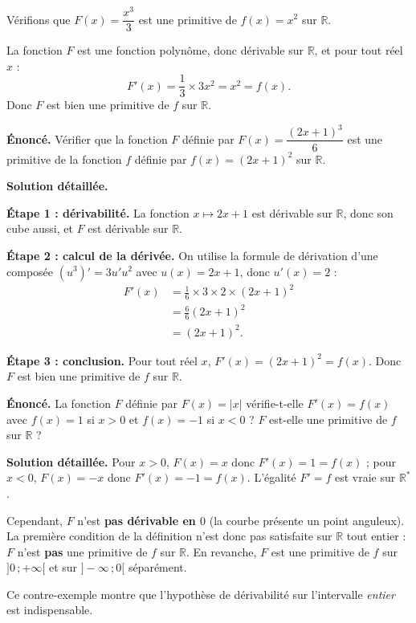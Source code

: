 \documentclass[11pt]{article}
\begin{document}
\begin{exemplebox}
Vérifions que $F(x) = \dfrac{x^3}{3}$ est une primitive de $f(x) = x^2$ sur $\mathbb{R}$.

La fonction $F$ est une fonction polynôme, donc dérivable sur $\mathbb{R}$, et pour tout réel $x$ :
\[ F'(x) = \frac{1}{3} \times 3x^2 = x^2 = f(x). \]
Donc $F$ est bien une primitive de $f$ sur $\mathbb{R}$.
\end{exemplebox}

\begin{exoresolu}
\textbf{Énoncé.} Vérifier que la fonction $F$ définie par $F(x) = \dfrac{(2x+1)^3}{6}$ est une primitive de la fonction $f$ définie par $f(x) = (2x+1)^2$ sur $\mathbb{R}$.

\tcblower
\textbf{Solution détaillée.}

\textbf{Étape 1 : dérivabilité.} La fonction $x \mapsto 2x+1$ est dérivable sur $\mathbb{R}$, donc son cube aussi, et $F$ est dérivable sur $\mathbb{R}$.

\textbf{Étape 2 : calcul de la dérivée.} On utilise la formule de dérivation d'une composée $(u^3)' = 3u'u^2$ avec $u(x) = 2x+1$, donc $u'(x) = 2$ :
\begin{align*}
F'(x) &= \frac{1}{6} \times 3 \times 2 \times (2x+1)^2 \\
&= \frac{6}{6}(2x+1)^2 \\
&= (2x+1)^2.
\end{align*}

\textbf{Étape 3 : conclusion.} Pour tout réel $x$, $F'(x) = (2x+1)^2 = f(x)$. Donc $F$ est bien une primitive de $f$ sur $\mathbb{R}$.
\end{exoresolu}

\begin{exoresolu}
\textbf{Énoncé.} La fonction $F$ définie par $F(x) = |x|$ vérifie-t-elle $F'(x) = f(x)$ avec $f(x) = 1$ si $x > 0$ et $f(x) = -1$ si $x < 0$ ? $F$ est-elle une primitive de $f$ sur $\mathbb{R}$ ?

\tcblower
\textbf{Solution détaillée.} Pour $x > 0$, $F(x) = x$ donc $F'(x) = 1 = f(x)$ ; pour $x < 0$, $F(x) = -x$ donc $F'(x) = -1 = f(x)$. L'égalité $F' = f$ est vraie sur $\mathbb{R}^*$.

Cependant, $F$ n'est \textbf{pas dérivable en $0$} (la courbe présente un point anguleux). La première condition de la définition n'est donc pas satisfaite sur $\mathbb{R}$ tout entier : $F$ n'est \textbf{pas} une primitive de $f$ sur $\mathbb{R}$. En revanche, $F$ est une primitive de $f$ sur $]0\,;+\infty[$ et sur $]-\infty\,;0[$ séparément.

Ce contre-exemple montre que l'hypothèse de dérivabilité sur l'intervalle \emph{entier} est indispensable.
\end{exoresolu}
\end{document}
